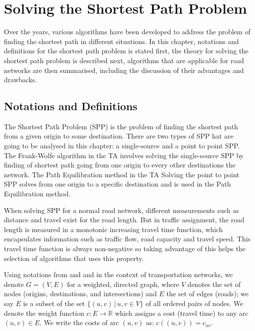 \chapter{Solving the Shortest Path Problem}
\label{chap:solvingspp}

Over the years,
various algorithms have been developed 
to address the problem of finding the shortest path in different situations.
In this chapter,
notations and definitions for the shortest path problem is stated first, 
the theory for solving the shortest path problem is described next,
algorithms that are applicable for road networks are then summarised,
including the discussion of their advantages and drawbacks.


\section{Notations and Definitions}
The Shortest Path Problem (SPP) is the problem of finding the shortest path from a given origin  to some destination.
There are two types of SPP hat are going to
be analysed in this chapter:
a single-source and a point to point SPP.  
The Frank-Wolfe algorithm in the TA involves
solving the single-source SPP by finding of shortest path going from one origin to every other destinations the network.
The Path Equilibration method in the TA
Solving the point to point SPP solves from one origin to a specific destination and is used in the Path Equilibration method. 

When solving SPP for a normal road network,
different measurements such as distance and travel exist for the road length.
But in traffic assignment,
the road length is measured in a monotonic increasing travel time function,
which encapsulates information such as traffic flow, road capacity and travel speed.
This travel time function is always non-negative so taking advantage of this helps the selection of algorithms that uses this property.

Using notations from \citet{Cormen} and \citet{Klunder} and in the context
of transportation networks,
we denote $ G = ( V, E ) $ for a weighted, directed graph,
where $ V $ denotes the set of nodes (origins, destinations, and intersections)
and $ E $ the set of edges (roads);
we say $ E $ is a subset of the set $ \{ (u, v)\, | \, u, v \in V \} $ of all ordered pairs of nodes.
We denote the weight function $ c : E \rightarrow \mathbb{R} $ which assigns a cost (travel time) to any arc $ (u,v) \in E $.
We write the costs of arc $(u, v)$ as: $ c((u, v)) = c_{uv} $.

